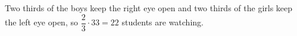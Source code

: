 Two thirds of the boys keep the right eye open and two thirds of the girls keep the left eye open, so $\dfrac23\cdot33=\boxed{22}$ students are watching.
